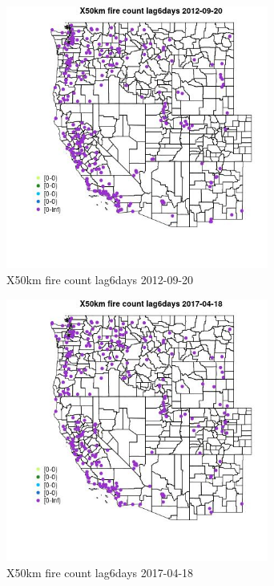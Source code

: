 \begin{figure} 
\centering  
\includegraphics[width=0.77\textwidth]{Code_Outputs/Report_ML_input_PM25_Step4_part_e_de_duplicated_aves_compiled_2019-05-14wNAs_MapObsX50km_fire_count_lag6days2012-09-20.jpg} 
\caption{\label{fig:Report_ML_input_PM25_Step4_part_e_de_duplicated_aves_compiled_2019-05-14wNAsMapObsX50km_fire_count_lag6days2012-09-20}X50km fire count lag6days 2012-09-20} 
\end{figure} 
 

\begin{figure} 
\centering  
\includegraphics[width=0.77\textwidth]{Code_Outputs/Report_ML_input_PM25_Step4_part_e_de_duplicated_aves_compiled_2019-05-14wNAs_MapObsX50km_fire_count_lag6days2017-04-18.jpg} 
\caption{\label{fig:Report_ML_input_PM25_Step4_part_e_de_duplicated_aves_compiled_2019-05-14wNAsMapObsX50km_fire_count_lag6days2017-04-18}X50km fire count lag6days 2017-04-18} 
\end{figure} 
 

